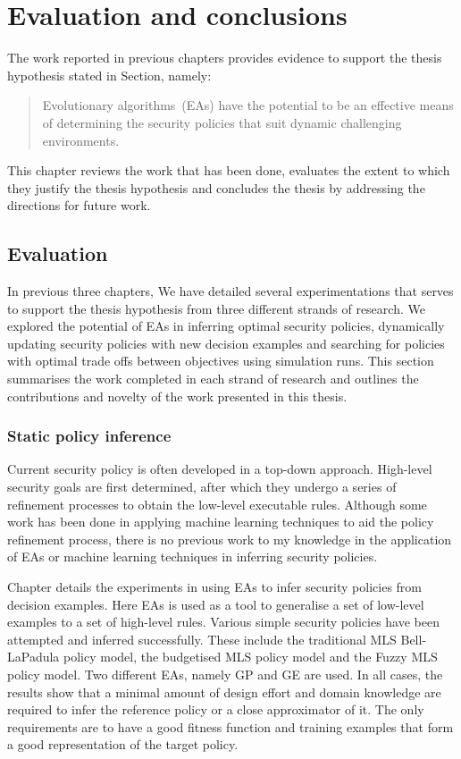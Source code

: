 \chapter{Evaluation and conclusions}
\graphicspath{{Chapter5/figures/}}
\label{EvaluationAndConclusion}
The work reported in previous chapters provides evidence to support
the thesis hypothesis stated in
Section, namely:
\begin{quote}
  Evolutionary algorithms~(EAs) have the potential to be an effective
  means of determining the security policies that suit dynamic
  challenging environments.
\end{quote}
This chapter reviews the work that has been done, evaluates the extent
to which they justify the thesis hypothesis and concludes the thesis
by addressing the directions for future work.

\section{Evaluation}
\label{Evaluation}
In previous three chapters, We have detailed several experimentations
that serves to support the thesis hypothesis from three different
strands of research. We explored the potential of EAs in inferring
optimal security policies, dynamically updating security policies with
new decision examples and searching for policies with optimal trade
offs between objectives using simulation runs. This section summarises
the work completed in each strand of research and outlines the
contributions and novelty of the work presented in this thesis.

\subsection{Static policy inference}
\label{Evaluation.StaticSecurityPolicyInference}
Current security policy is often developed in a top-down
approach. High-level security goals are first determined, after which
they undergo a series of refinement processes to obtain the low-level
executable rules. Although some work has been done in applying machine
learning techniques to aid the policy refinement process, there is no
previous work to my knowledge in the application of EAs or machine
learning techniques in inferring security policies.

Chapter  details the experiments in
using EAs to infer security policies from decision examples. Here EAs
is used as a tool to generalise a set of low-level examples to a set
of high-level rules. Various simple security policies have been
attempted and inferred successfully. These include the traditional MLS
Bell-LaPadula policy model, the budgetised MLS policy model and the
Fuzzy MLS policy model. Two different EAs, namely GP and GE are
used. In all cases, the results show that a minimal amount of design
effort and domain knowledge are required to infer the reference policy
or a close approximator of it. The only requirements are to have a
good fitness function and training examples that form a good
representation of the target policy.

